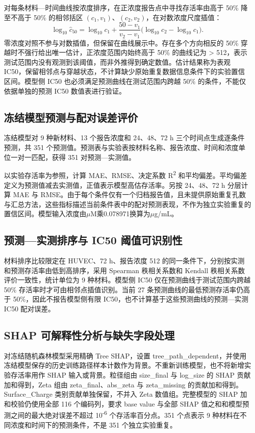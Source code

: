 \documentclass[letterpaper]{article}
\begin{document}
对每条材料—时间曲线按浓度排序，在正浓度报告点中寻找存活率由高于 50\% 降至不高于 50\% 的相邻括区 $(c_1,v_1)$、$(c_2,v_2)$，在对数浓度尺度插值：
\begin{equation}
\log_{10}\widehat c_{50}=\log_{10}c_1+
\frac{50-v_1}{v_2-v_1}\bigl(\log_{10}c_2-\log_{10}c_1\bigr).
\end{equation}
零浓度对照不参与对数插值，但保留在曲线展示中。存在多个方向相反的 50\% 穿越时不强行给出唯一估计，正浓度范围内始终高于 50\% 的曲线记为 > 512，表示测试范围内没有观测到该阈值，而非外推得到确定数值。估计结果称为表观 IC50，保留相邻点与穿越状态，不计算缺少原始重复数据信息条件下的实验置信区间。模型侧 IC50 也必须满足预测曲线在测试范围内跨越 50\% 的条件，不能仅依据单独的预测 IC50 数值表进行验证。

\subsection{冻结模型预测与配对误差评价}

冻结模型对 9 种新材料、13 个报告浓度和 24、48、72 h 三个时间点生成逐条件预测，共 351 个预测值。预测表与实验表按材料名称、报告浓度、时间和浓度单位一对一匹配，获得 351 对预测—实测值。

以实验存活率为参照，计算 MAE、RMSE、决定系数 R\textsuperscript{2} 和平均偏差。平均偏差定义为预测值减去实测值，正值表示模型高估存活率。另按 24、48、72 h 分层计算 MAE 与 RMSE。由于每个条件仅有一个归档报告值，且未提供原始重复孔数与汇总方法，这些指标描述当前条件表中的配对预测表现，不作为独立实验重复的置信区间。模型输入浓度由$\mu$M乘0.078971换算为$\mu$g/mL。

\subsection{预测—实测排序与 IC50 阈值可识别性}

材料排序比较限定在 HUVEC、72 h、报告浓度 512 的同一条件下，分别按实测和预测存活率由低到高排序，采用 Spearman 秩相关系数和 Kendall 秩相关系数评价一致性，统计单位为 9 种材料。模型侧 IC50 仅在预测曲线于测试范围内跨越 50\% 存活率时才可由相邻点插值识别。当前 27 条预测曲线的最低预测存活率仍高于 50\%，因此不报告模型侧有限 IC50，也不计算基于这些预测曲线的预测—实测 IC50 配对误差。

\subsection{SHAP 可解释性分析与缺失字段处理}

对冻结随机森林模型采用精确 Tree SHAP，设置 tree\_path\_dependent，并使用冻结模型保存的历史训练路径样本计数作为背景。不重新训练模型，也不将新增实验存活率用作 SHAP 输入或背景。粒径组由 size\_final 与 log\_size 的 SHAP 贡献加和得到，Zeta 组由 zeta\_final、abs\_zeta 与 zeta\_missing 的贡献加和得到。Surface\_Charge 类别贡献单独保留，不并入 Zeta 数值组。完整模型的 SHAP 加和校验仍使用全部 116 个编码列，要求 base value 与全部 SHAP 值之和和模型预测之间的最大绝对误差不超过 10\textsuperscript{-}\textsuperscript{6} 个存活率百分点。351 个点表示 9 种材料在不同浓度和时间下的预测条件，不是 351 个独立实验重复。
\end{document}
